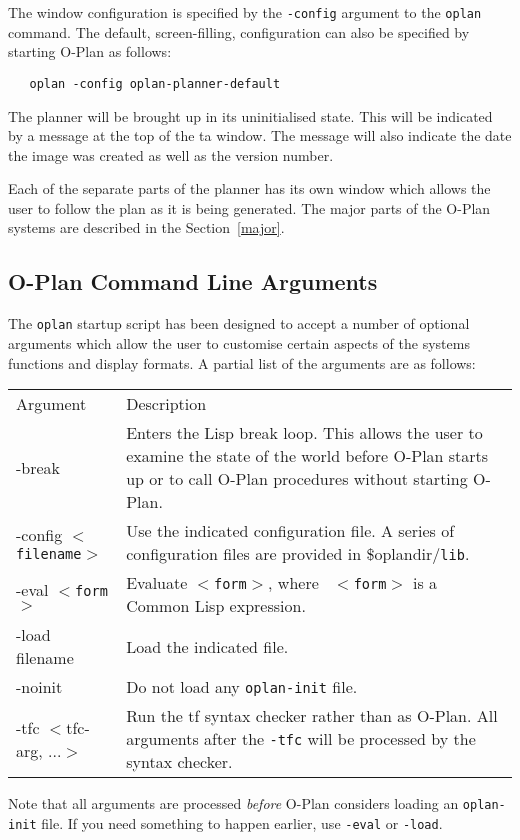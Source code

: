 The window configuration is specified by the {\tt -config} argument to
the {\tt oplan} command.  The default, screen-filling, configuration
can also be specified by starting O-Plan as follows:

\begin{verbatim} 
   oplan -config oplan-planner-default
\end{verbatim}

The planner will be brought up in its uninitialised state. This will
be indicated by a message at the top of the {\sc ta} window. The
message will also indicate the date the image was created as well as
the version number. 

Each of the separate parts of the planner has its own window which
allows the user to follow the plan as it is being generated. The major
parts of the O-Plan systems are described in the Section~\ref{major}.

\subsection{\protect\label{cla}O-Plan Command Line Arguments}
The {\tt oplan} startup script has been designed to accept a number of
optional arguments which allow the user to customise certain aspects
of the systems functions and display formats. A partial list of the
arguments are as follows:

\begin{tabular}{lp{11cm}}
Argument & Description \\
-break & Enters the Lisp break loop. This allows the user to examine
the state of the world before O-Plan starts up or to call O-Plan
procedures without starting O-Plan. \\
-config {\tt $<$filename$>$} & Use the indicated configuration file. A
series of configuration files are provided in {\sc \$oplandir}/{\tt lib}. \\
-eval {\tt $<$form$>$} & Evaluate {\tt $<$form$>$}, where {\tt
$<$form$>$} is a Common Lisp expression. \\
-load filename & Load the indicated file. \\
-noinit & Do not load any {\tt oplan-init} file. \\
-tfc $<$tfc-arg, ...$>$ & Run the {\sc tf} syntax checker rather than as
O-Plan. All arguments after the {\tt -tfc} will be processed by the
syntax checker. 
\end{tabular}

Note that all arguments are processed {\em before} O-Plan considers
loading an {\tt oplan-init} file. If you need something to happen
earlier, use {\tt -eval} or {\tt -load}.

